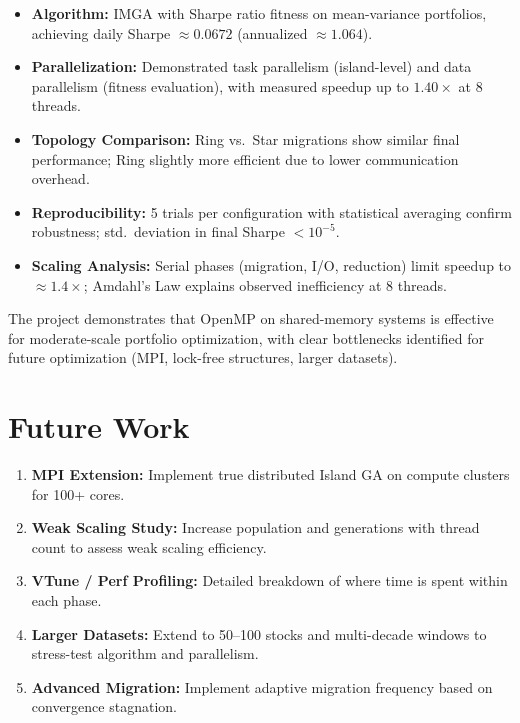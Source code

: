 \documentclass[12pt,a4paper]{article}
\begin{document}
\begin{itemize}
	\item \textbf{Algorithm:} IMGA with Sharpe ratio fitness on mean-variance portfolios, achieving daily Sharpe $\approx 0.0672$ (annualized $\approx 1.064$).
	
	\item \textbf{Parallelization:} Demonstrated task parallelism (island-level) and data parallelism (fitness evaluation), with measured speedup up to $1.40 \times$ at 8 threads.
	
	\item \textbf{Topology Comparison:} Ring vs.~Star migrations show similar final performance; Ring slightly more efficient due to lower communication overhead.
	
	\item \textbf{Reproducibility:} 5 trials per configuration with statistical averaging confirm robustness; std.~deviation in final Sharpe $< 10^{-5}$.
	
	\item \textbf{Scaling Analysis:} Serial phases (migration, I/O, reduction) limit speedup to $\approx 1.4 \times$; Amdahl's Law explains observed inefficiency at 8 threads.
\end{itemize}

The project demonstrates that OpenMP on shared-memory systems is effective for moderate-scale portfolio optimization, with clear bottlenecks identified for future optimization (MPI, lock-free structures, larger datasets).

\newpage
\section{Future Work}

\begin{enumerate}
	\item \textbf{MPI Extension:} Implement true distributed Island GA on compute clusters for 100+ cores.
	
	\item \textbf{Weak Scaling Study:} Increase population and generations with thread count to assess weak scaling efficiency.
	
	\item \textbf{VTune / Perf Profiling:} Detailed breakdown of where time is spent within each phase.
	
	\item \textbf{Larger Datasets:} Extend to 50--100 stocks and multi-decade windows to stress-test algorithm and parallelism.
	
	\item \textbf{Advanced Migration:} Implement adaptive migration frequency based on convergence stagnation.
\end{enumerate}

\newpage
{}


\end{document}
